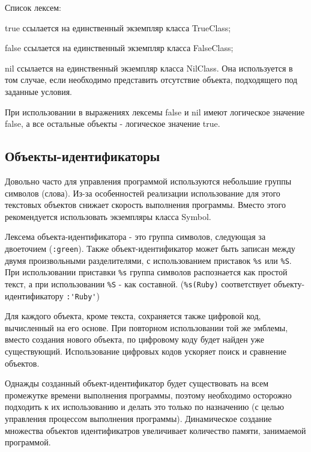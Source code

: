 \begin{keylist}{Список лексем:}
  
   true ссылается на единственный экземпляр класса TrueClass;
  
   false ссылается на единственный экземпляр класса FalseClass;
  
   nil ссылается на единственный экземпляр класса NilClass. Она используется в том случае, если необходимо представить отсутствие объекта, подходящего под заданные условия.
\end{keylist}

При использовании в выражениях лексемы false и nil имеют логическое значение false, а все остальные объекты - логическое значение true.

\subsection{Объекты-идентификаторы}

Довольно часто для управления программой используются небольшие группы символов (слова). Из-за особенностей реализации использование для этого текстовых объектов снижает скорость выполнения программы. Вместо этого рекомендуется использовать экземпляры класса Symbol.

Лексема объекта-идентификатора - это группа символов, следующая за двоеточием (\verb!:green!). Также объект-идентификатор может быть записан между двумя произвольными разделителями, с использованием приставок \verb!%s! или \verb!%S!. При использовании приставки \verb!%s! группа символов распознается как простой текст, а при использовании \verb!%S! - как составной. 
(\verb!%s(Ruby)! соответствует объекту-идентификатору \verb!:'Ruby'!)

Для каждого объекта, кроме текста, сохраняется также цифровой код, вычисленный на его основе. При повторном использовании той же эмблемы, вместо создания нового объекта, по цифровому коду будет найден уже существующий. Использование цифровых кодов ускоряет поиск и сравнение объектов.
\begin{note}
  Однажды созданный объект-идентификатор будет существовать на всем промежутке времени выполнения программы, поэтому необходимо осторожно подходить к их использованию и делать это только по назначению (с целью управления процессом выполнения программы). Динамическое создание множества объектов идентификатров увеличивает количество памяти, занимаемой программой.
\end{note}

